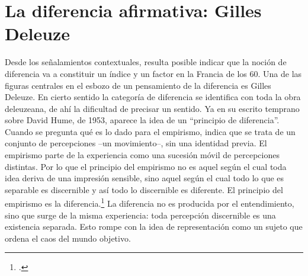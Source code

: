 \section{La diferencia afirmativa: Gilles Deleuze}

Desde los señalamientos contextuales, resulta posible indicar que la
noción de diferencia va a constituir un índice y un factor en la Francia
de los 60. Una de las figuras centrales en el esbozo de un pensamiento
de la diferencia es Gilles Deleuze. En cierto sentido la categoría de
diferencia se identifica con toda la obra deleuzeana, de ahí la
dificultad de precisar un sentido. Ya en su escrito temprano sobre David
Hume, de 1953, aparece la idea de un \enquote{principio de diferencia}. Cuando
se pregunta qué es lo dado para el empirismo, indica que se trata de un
conjunto de percepciones --un movimiento--, sin una identidad previa. El
empirismo parte de la experiencia como una sucesión móvil de
percepciones distintas. Por lo que el principio del empirismo no es
aquel según el cual toda idea deriva de una impresión sensible, sino
aquel según el cual todo lo que es separable es discernible y así todo
lo discernible es diferente. El principio del empirismo es la
diferencia.\footcite{deleuze1996} La diferencia no es producida por el
entendimiento, sino que surge de la misma experiencia: toda percepción
discernible es una existencia separada. Esto rompe con la idea de
representación como un sujeto que ordena el caos del mundo objetivo.

